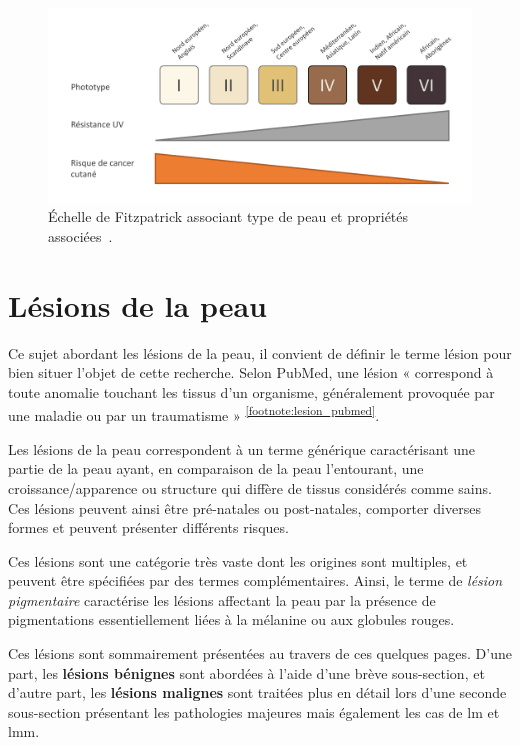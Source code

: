\begin{figure}[H]
    \centering
    \includegraphics[width=0.8\linewidth]{contents/chapter_1/resources/scheme_fitzpatrick_scale.pdf}
    \caption{Échelle de Fitzpatrick associant type de peau et propriétés associées~\cite{Fitzpatrick1988}.}
    \label{fig:scheme_fitzpatrick_scale}
\end{figure}


\section{Lésions de la peau}
Ce sujet abordant les lésions de la peau, il convient de définir le terme lésion pour bien situer l’objet de cette recherche. Selon PubMed, une lésion « correspond à toute anomalie touchant les tissus d’un organisme, généralement provoquée par une maladie ou par un traumatisme » \textsuperscript{\ref{footnote:lesion_pubmed}}.\par
\addtocounter{footnote}{1}

Les lésions de la peau correspondent à un terme générique caractérisant une partie de la peau ayant, en comparaison de la peau l’entourant, une croissance/apparence ou structure qui diffère de tissus considérés comme sains. Ces lésions peuvent ainsi être pré-natales ou post-natales, comporter diverses formes et peuvent présenter différents risques.\par

Ces lésions sont une catégorie très vaste dont les origines sont multiples, et peuvent être spécifiées par des termes complémentaires. Ainsi, le terme de \textit{lésion pigmentaire} caractérise les lésions affectant la peau par la présence de pigmentations essentiellement liées à la mélanine ou aux globules rouges.\par

Ces lésions sont sommairement présentées au travers de ces quelques pages. D'une part, les \textbf{lésions bénignes} sont abordées à l'aide d'une brève sous-section, et d'autre part, les \textbf{lésions malignes} sont traitées plus en détail lors d'une seconde sous-section présentant les pathologies majeures mais également les cas de \acrlong{lm} et \acrlong{lmm}.\par

